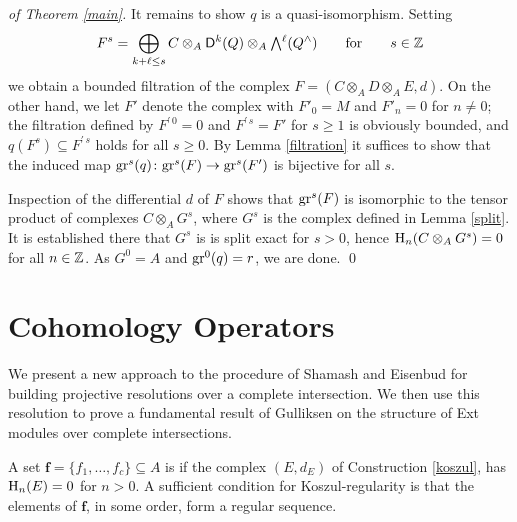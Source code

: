 \begin{proof}[of Theorem \ref{main}]
It remains to show $q$ is a quasi-isomorphism.  Setting
\[
F^s = \bigoplus_{k+\ell \le s} C \otimes_A {\mathsf D}^k(Q)
\otimes_A {\textstyle\bigwedge\limits}{}^\ell (Q^\wedge)
\qquad\text{for}\qquad s\in{\mathbb Z}
\]
we obtain a bounded filtration of the complex $F= (C \otimes_A D
\otimes_A E,d)$.  On the other hand, we let $F'$ denote the complex
with $F'_0=M$ and $F'_n=0$ for $n\ne0$; the filtration defined by
$F^{\prime\,0}=0$ and $F^{\prime\,s}=F'$ for $s\ge1$ is obviously
bounded, and $q(F^s)\subseteq F^{\prime\,s}$ holds for all $s\ge0$.  By
Lemma \ref{filtration} it suffices to show that the induced map
${\operatorname{gr}}^s(q)\colon {\operatorname{gr}}^s(F)\to{\operatorname{gr}}^s(F')$ is bijective for all $s$.

Inspection of the differential $d$ of $F$ shows that ${\operatorname{gr}}^s(F)$ is
isomorphic to the tensor product of complexes $C\otimes_A G^s$, where
$G^s$ is the complex defined in Lemma \ref{split}.  It is established
there that $G^s$ is is split exact for $s>0$, hence ${\operatorname{H}}_n(C\otimes_A
G^s)=0$ for all $n\in{\mathbb Z}$.  As $G^0=A$ and ${\operatorname{gr}}^0(q)=r$, we are done.
 \qed \end{proof}

\section{Cohomology Operators}
\label{Cohomology operators}

We present a new approach to the procedure of Shamash \cite{CI:Sh} and
Eisenbud \cite{CI:Ei} for building projective resolutions over a
complete intersection.  We then use this resolution to prove a
fundamental result of Gulliksen \cite{CI:MR51:487} on the structure of
Ext modules over complete intersections.

A set ${\boldsymbol f}=\{f_1 , \dots, f_c\}\subseteq A$ is
{\it{}\/} if the complex $(E,d_E)$ of Construction
\ref{koszul}, has ${\operatorname{H}}_n(E)=0$ for $n>0$.  A sufficient condition for
Koszul-regularity is that the elements of ${\boldsymbol f}$, in some
order, form a regular sequence.

